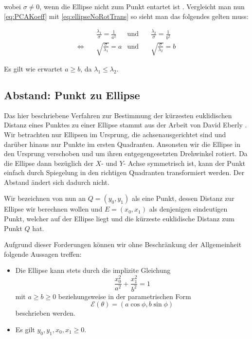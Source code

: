 wobei $\sigma \neq 0$, wenn die Ellipse nicht zum Punkt entartet ist \cite{Lawrence1972}. Vergleicht man nun \ref{eq:PCAKoeff} mit \ref{eq:ellipseNoRotTrans} so sieht man das folgendes gelten muss: 

\begin{equation}
\begin{aligned}
&\frac{\lambda_1}{\sigma} = \frac{1}{a^2} &\text{und}\quad &\frac{\lambda_2}{\sigma} = \frac{1}{b^2}\\
\Leftrightarrow\quad & \sqrt{\frac{\sigma}{\lambda_1}}  = a  &\text{und}\quad & \sqrt{\frac{\sigma}{\lambda_2}}  = b
\end{aligned}
\end{equation}

Es gilt wie erwartet $a \geq b$, da $\lambda_1 \leq \lambda_2$.


\subsection{Abstand: Punkt zu Ellipse}
\label{sc:distPointEllipse}
Das hier beschriebene Verfahren zur Bestimmung der kürzesten euklidischen Distanz eines Punktes zu einer Ellipse stammt aus der Arbeit von David Eberly \cite{Eberly2013}.
Wir betrachten nur Ellipsen im Ursprung, die achsenausgerichtet sind und darüber hinaus nur Punkte im ersten Quadranten. Ansonsten wir die Ellipse in den Ursprung verschoben und um ihren entgegengesetzten Drehwinkel rotiert. Da die Ellipse dann bezüglich der $X$- und $Y$- Achse symmetrisch ist, kann der Punkt einfach durch Spiegelung in den richtigen Quadranten transformiert werden. Der Abstand ändert sich dadurch nicht. 

Wir bezeichnen von nun an $Q = (y_0, y_1)$ als eine Punkt, dessen Distanz zur Ellipse wir berechnen wollen und $E = (x_0, x_1)$ als denjenigen eindeutigen Punkt, welcher auf der Ellipse liegt und die kürzeste euklidische Distanz zum Punkt $Q$ hat. 

Aufgrund dieser Forderungen können wir ohne Beschränkung der Allgemeinheit folgende Aussagen treffen:
\begin{itemize}
	\item Die Ellipse kann stets durch die implizite Gleichung 
	\begin{equation}\label{eq:distEqParam} \frac{x_0^2}{a^2} + \frac{x_1^2}{b^2} = 1\end{equation}
	 mit $a \geq b \geq 0$ beziehungsweise
	in der parametrischen Form \[\mathcal{E}(\theta) = (a\cos\phi, b\sin\phi)  \tag*{$\phi \in [0, 2\pi)$}\] beschrieben werden.
	\item Es gilt $y_0,y_1,x_0, x_1 \geq 0$.
\end{itemize}

